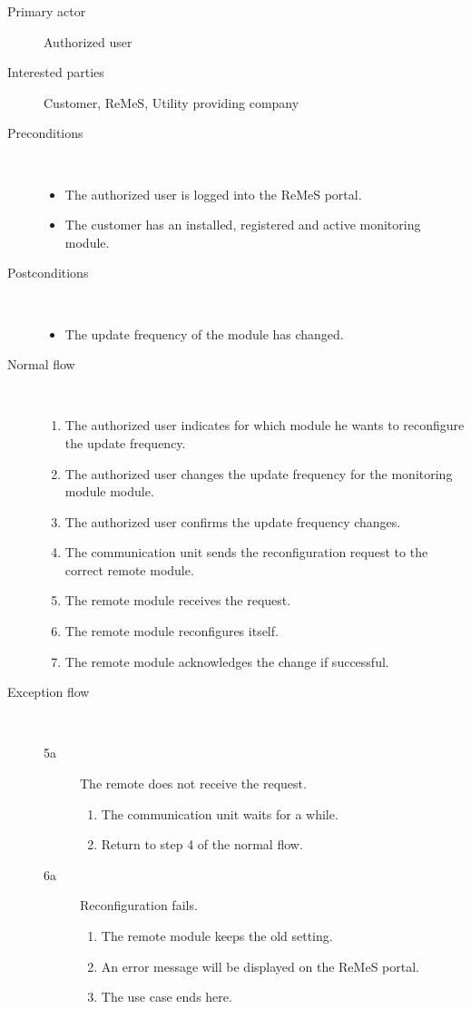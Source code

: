 \begin{description}
	\item[Primary actor] Authorized user
	\item[Interested parties] Customer, ReMeS, Utility providing company
	\item[Preconditions] \ 
	\begin{itemize}
		\item The authorized user is logged into the ReMeS portal.
		\item The customer has an installed, registered and active monitoring module.
	\end{itemize}
	\item[Postconditions] \ 
	\begin{itemize}
		\item The update frequency of the module has changed.
	\end{itemize}
	\item[Normal flow] \ 
	\begin{enumerate}
	  	\item The authorized user indicates for which module he wants to reconfigure
	  	the update frequency.
	  	\item The authorized user changes the update frequency for the monitoring
	  	module module.
	  	\item The authorized user confirms the update frequency changes.
	  	\item The communication unit sends the reconfiguration request to the
	  	correct remote module.
	  	\item The remote module receives the request.
	  	\item The remote module reconfigures itself.
	  	\item The remote module acknowledges the change if successful.
	\end{enumerate}
	\item[Exception flow] \ 
	\begin{description}
		\item[5a] The remote does not receive the request.
		\begin{enumerate}
			\item The communication unit waits for a while.
			\item Return to step 4 of the normal flow.
		\end{enumerate}
		\item[6a] Reconfiguration fails.
		\begin{enumerate}
			\item The remote module keeps the old setting.
			\item An error message will be displayed on the ReMeS portal.
			\item The use case ends here.
		 \end{enumerate}
	\end{description}
\end{description}